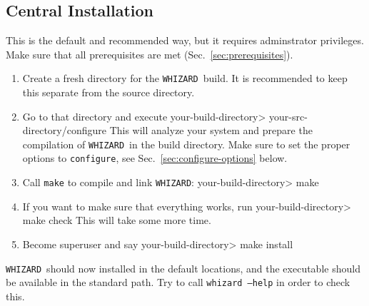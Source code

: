 \documentclass[12pt]{book}
\newenvironment{interaction}%
  {\begingroup\small
   \verbatim}%
  {\endverbatim
   \endgroup\noindent}
\newcommand{\ttt}[1]{\texttt{#1}}
\newcommand{\whizard}{\texttt{WHIZARD}}
\begin{document}
\subsection{Central Installation}
This is the default and recommended way, but it requires adminstrator
privileges.  Make sure that all
prerequisites are met (Sec.~\ref{sec:prerequisites}).
\begin{enumerate}
\item
  Create a fresh directory for the \whizard\ build.  It is recommended
  to keep this separate from the source directory.
\item
  Go to that directory and execute
  \begin{interaction}
    your-build-directory> your-src-directory/configure
  \end{interaction}
  This will analyze your system and prepare the compilation of \whizard\
  in the build directory.  Make sure to set the proper options to
  \ttt{configure}, see Sec.~\ref{sec:configure-options} below.
\item
  Call \ttt{make} to compile and link \whizard:
  \begin{interaction}
    your-build-directory> make
  \end{interaction}
\item
  If you want to make sure that everything works, run
  \begin{interaction}
    your-build-directory> make check
  \end{interaction}
  This will take some more time.
\item
  Become superuser and say
  \begin{interaction}
    your-build-directory> make install
  \end{interaction}
\end{enumerate}
\whizard\ should now installed in the default locations, and the
executable should be available in the standard path.  Try to call
\ttt{whizard --help} in order to check this.
\end{document}
